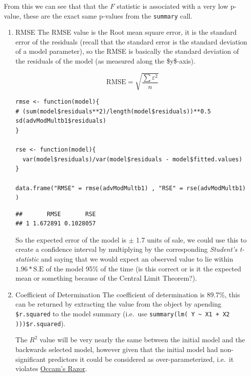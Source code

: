 \documentclass[11pt]{article}
\begin{document}
From this we can see that that the \(F\) statistic is associated with a
very low p-value, these are the exact same p-values from the \texttt{summary}
call.

\begin{enumerate}
\item RMSE
\label{sec:org6f199ff}
The RMSE value is the Root mean square error, it is the standard error
of the residuals (recall that the standard error is the standard
deviation of a model parameter), so the RMSE is basically the standard
deviation of the residuals of the model (as measured along the
\$y\$-axis).

$$
  \text{RMSE} = \sqrt{\frac{\sum{\varepsilon^2}}{n}}
  $$

\begin{verbatim}
rmse <- function(model){
# (sum(model$residuals**2)/length(model$residuals))**0.5
sd(advModMultb1$residuals)
}

rse <- function(model){
  var(model$residuals)/var(model$residuals - model$fitted.values)
}

data.frame("RMSE" = rmse(advModMultb1) , "RSE" = rse(advModMultb1) )
\end{verbatim}

\begin{verbatim}
##       RMSE       RSE
## 1 1.672891 0.1028057
\end{verbatim}

So the expected error of the model is \(\pm\) 1.7 units of sale, we could
use this to create a confidence interval by multiplying by the
corresponding \emph{Student's t-statistic} and saying that we would expect an
observed value to lie within \(1.96 * \text{S.E}\) of the model 95\% of the
time (is this correct or is it the expected mean or something because of
the Central Limit Theorem?).

\item Coefficient of Determination
\label{sec:orgd1fb469}
The coefficient of determination is 89.7\%, this can be returned by
extracting the value from the object by apending \texttt{\$r.squared} to the
model summary (i.e. use \texttt{summary(lm( Y \textasciitilde{} X1 + X2  )))\$r.squared}).

The \(R^2\) value will be very nearly the same between the initial model
and the backwards selected model, however given that the initial model
had non-significant predictors it could be considered as
over-parameterized, i.e. it violates
\href{https://en.wikipedia.org/wiki/Occam\%27s\_razor}{Occam's Razor}.


\end{enumerate}
\end{document}
